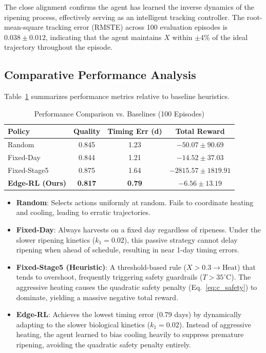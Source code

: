 The close alignment confirms the agent has learned the inverse dynamics of the ripening process, effectively serving as an intelligent tracking controller. The root-mean-square tracking error (RMSTE) across 100 evaluation episodes is $0.038 \pm 0.012$, indicating that the agent maintains $X$ within $\pm 4\%$ of the ideal trajectory throughout the episode.

\subsection{Comparative Performance Analysis}
Table~\ref{tab:baseline_comparison} summarizes performance metrics relative to baseline heuristics.

\begin{table}[htbp]
\caption{Performance Comparison vs. Baselines (100 Episodes)}
\label{tab:baseline_comparison}
\centering
\begin{tabular}{@{}lccc@{}}
\toprule
\textbf{Policy} & \textbf{Quality} & \textbf{Timing Err (d)} & \textbf{Total Reward} \\
\midrule
Random & 0.845 & 1.23 & $-50.07 \pm 90.69$ \\
Fixed-Day & 0.844 & 1.21 & $-14.52 \pm 37.03$ \\
Fixed-Stage5 & 0.875 & 1.64 & $-2815.57 \pm 1819.91$ \\
\textbf{Edge-RL (Ours)} & \textbf{0.817} & \textbf{0.79} & $\mathbf{-6.56 \pm 13.19}$ \\
\bottomrule
\end{tabular}
\end{table}

\begin{itemize}
    \item \textbf{Random}: Selects actions uniformly at random. Fails to coordinate heating and cooling, leading to erratic trajectories.
    \item \textbf{Fixed-Day}: Always harvests on a fixed day regardless of ripeness. Under the slower ripening kinetics ($k_1=0.02$), this passive strategy cannot delay ripening when ahead of schedule, resulting in near 1-day timing errors.
    \item \textbf{Fixed-Stage5 (Heuristic)}: A threshold-based rule ($X > 0.3 \to \text{Heat}$) that tends to overshoot, frequently triggering safety guardrails ($T > 35^\circ$C). The aggressive heating causes the quadratic safety penalty (Eq.~\ref{eq:c_safety}) to dominate, yielding a massive negative total reward.
    \item \textbf{Edge-RL}: Achieves the lowest timing error (0.79 days) by dynamically adapting to the slower biological kinetics ($k_1=0.02$). Instead of aggressive heating, the agent learned to bias cooling heavily to suppress premature ripening, avoiding the quadratic safety penalty entirely.
\end{itemize}


